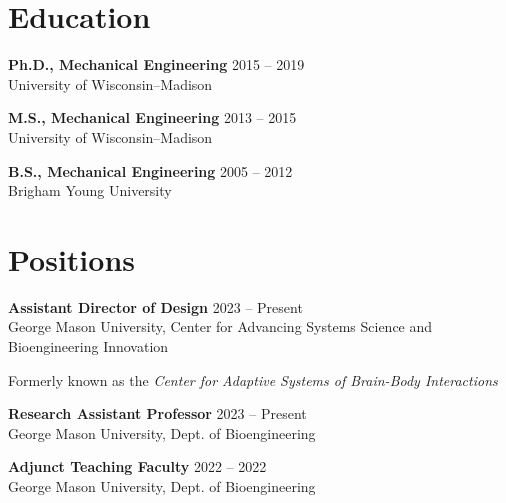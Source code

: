 \documentclass[letterpaper, 10pt]{article}
\begin{document}


\section{Education}

\textbf{Ph.D., Mechanical Engineering}
\hfill 2015 -- 2019\\ %
University of Wisconsin–Madison %
\medskip

\textbf{M.S., Mechanical Engineering}
\hfill 2013 -- 2015\\ %
University of Wisconsin–Madison %
\medskip

\textbf{B.S., Mechanical Engineering}
\hfill 2005 -- 2012\\ %
Brigham Young University %

\section{Positions}

\textbf{Assistant Director of Design}
\hfill 2023 -- Present\\
George Mason University, Center for Advancing Systems Science and Bioengineering Innovation
     \begin{compactitem}
	     \begin{footnotesize}
     	     \item[] Formerly known as the \textit{Center for Adaptive Systems of Brain-Body Interactions}
	     \end{footnotesize}
     \end{compactitem}
\medskip

\textbf{Research Assistant Professor}
\hfill 2023 -- Present\\ %
George Mason University, Dept. of Bioengineering
\medskip

\textbf{Adjunct Teaching Faculty}
\hfill 2022 -- 2022\\ %
George Mason University, Dept. of Bioengineering
\medskip
\end{document}
